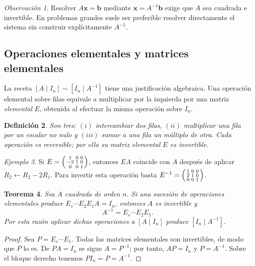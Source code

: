 \documentclass[12pt]{article}
\newtheorem{definicion}{Definición}[section]
\newtheorem{teorema}[definicion]{Teorema}
\theoremstyle{remark}
\newtheorem{observacion}[definicion]{Observación}
\newtheorem{ejemplo}[definicion]{Ejemplo}
\newcommand{\vect}[1]{\boldsymbol{#1}}
\begin{document}
\begin{observacion}
Resolver $A\vect{x}=\vect{b}$ mediante $\vect{x}=A^{-1}\vect{b}$ exige que $A$ sea cuadrada e invertible. En problemas grandes suele ser preferible resolver directamente el sistema sin construir explícitamente $A^{-1}$.
\end{observacion}

\subsection*{Operaciones elementales y matrices elementales}
La receta $[A\mid I_n]\sim[I_n\mid A^{-1}]$ tiene una justificación algebraica. Una operación elemental sobre filas equivale a multiplicar por la izquierda por una matriz \emph{elemental} $E$, obtenida al efectuar la misma operación sobre $I_n$.

\begin{definicion}
Son tres: $(i)$ intercambiar dos filas, $(ii)$ multiplicar una fila por un escalar no nulo y $(iii)$ sumar a una fila un múltiplo de otra. Cada operación es reversible; por ello su matriz elemental $E$ es invertible.
\end{definicion}

\begin{ejemplo}
Si $E=\begin{psmallmatrix}1&0&0\\-2&1&0\\0&0&1\end{psmallmatrix}$, entonces $EA$ coincide con $A$ después de aplicar $R_2\leftarrow R_2-2R_1$. Para invertir esta operación basta $E^{-1}=\begin{psmallmatrix}1&0&0\\2&1&0\\0&0&1\end{psmallmatrix}$.
\end{ejemplo}


\begin{teorema}
Sea $A$ cuadrada de orden $n$. Si una sucesión de operaciones elementales produce $E_s\cdots E_2E_1A=I_n$, entonces $A$ es invertible y
\[
\boxed{A^{-1}=E_s\cdots E_2E_1.}
\]
Por esta razón aplicar dichas operaciones a $[A\mid I_n]$ produce $[I_n\mid A^{-1}]$.
\end{teorema}
\begin{proof}
Sea $P=E_s\cdots E_1$. Todas las matrices elementales son invertibles, de modo que $P$ lo es. De $PA=I_n$ se sigue $A=P^{-1}$; por tanto, $AP=I_n$ y $P=A^{-1}$. Sobre el bloque derecho tenemos $PI_n=P=A^{-1}$.
\end{proof}
\end{document}
